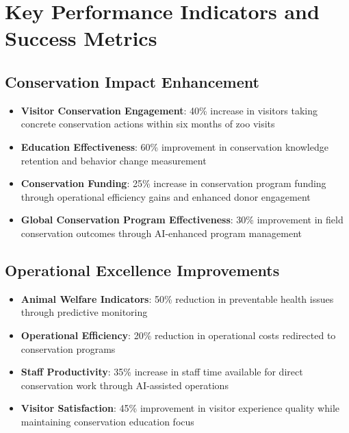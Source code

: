 \documentclass[
  Letterpaper,
]{scrbook}
\providecommand{\tightlist}{%
  \setlength{\itemsep}{0pt}\setlength{\parskip}{0pt}}
\begin{document}
\section*{Key Performance Indicators and Success
Metrics}\label{key-performance-indicators-and-success-metrics}


\subsection*{Conservation Impact
Enhancement}\label{conservation-impact-enhancement}

\begin{itemize}
\tightlist
\item
  \textbf{Visitor Conservation Engagement}: 40\% increase in visitors
  taking concrete conservation actions within six months of zoo visits
\item
  \textbf{Education Effectiveness}: 60\% improvement in conservation
  knowledge retention and behavior change measurement
\item
  \textbf{Conservation Funding}: 25\% increase in conservation program
  funding through operational efficiency gains and enhanced donor
  engagement
\item
  \textbf{Global Conservation Program Effectiveness}: 30\% improvement
  in field conservation outcomes through AI-enhanced program management
\end{itemize}

\subsection*{Operational Excellence
Improvements}\label{operational-excellence-improvements}

\begin{itemize}
\tightlist
\item
  \textbf{Animal Welfare Indicators}: 50\% reduction in preventable
  health issues through predictive monitoring
\item
  \textbf{Operational Efficiency}: 20\% reduction in operational costs
  redirected to conservation programs
\item
  \textbf{Staff Productivity}: 35\% increase in staff time available for
  direct conservation work through AI-assisted operations
\item
  \textbf{Visitor Satisfaction}: 45\% improvement in visitor experience
  quality while maintaining conservation education focus
\end{itemize}
\end{document}
